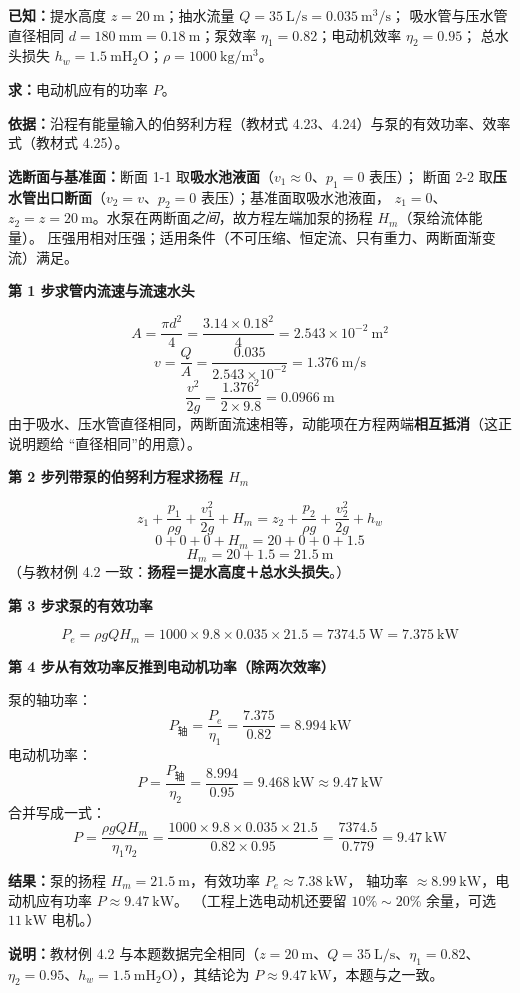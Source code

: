 \begin{jie}
\textbf{已知：}提水高度 $z=20\ \mathrm{m}$；抽水流量 $Q=35\ \mathrm{L/s}=0.035\ \mathrm{m^3/s}$；
吸水管与压水管直径相同 $d=180\ \mathrm{mm}=0.18\ \mathrm{m}$；泵效率 $\eta_1=0.82$；电动机效率 $\eta_2=0.95$；
总水头损失 $h_w=1.5\ \mathrm{mH_2O}$；$\rho=1000\ \mathrm{kg/m^3}$。

\textbf{求：}电动机应有的功率 $P$。

\textbf{依据：}沿程有能量输入的伯努利方程（教材式 4.23、4.24）与泵的有效功率、效率式（教材式 4.25）。

\textbf{选断面与基准面：}断面 1-1 取\textbf{吸水池液面}（$v_1\approx0$、$p_1=0$ 表压）；
断面 2-2 取\textbf{压水管出口断面}（$v_2=v$、$p_2=0$ 表压）；基准面取吸水池液面，
$z_1=0$、$z_2=z=20\ \mathrm{m}$。水泵在两断面\emph{之间}，故方程左端加泵的扬程 $H_m$（泵给流体能量）。
压强用相对压强；适用条件（不可压缩、恒定流、只有重力、两断面渐变流）满足。

\textbf{第 1 步\quad 求管内流速与流速水头}

\[ A=\frac{\pi d^2}{4}=\frac{3.14\times0.18^2}{4}=2.543\times10^{-2}\ \mathrm{m^2} \]
\[ v=\frac{Q}{A}=\frac{0.035}{2.543\times10^{-2}}=1.376\ \mathrm{m/s} \]
\[ \frac{v^2}{2g}=\frac{1.376^2}{2\times9.8}=0.0966\ \mathrm{m} \]
由于吸水、压水管直径相同，两断面流速相等，动能项在方程两端\textbf{相互抵消}（这正说明题给
“直径相同”的用意）。

\textbf{第 2 步\quad 列带泵的伯努利方程求扬程 $H_m$}

\[ z_1+\frac{p_1}{\rho g}+\frac{v_1^2}{2g}+H_m=z_2+\frac{p_2}{\rho g}+\frac{v_2^2}{2g}+h_w \]
\[ 0+0+0+H_m=20+0+0+1.5 \]
\[ H_m=20+1.5=21.5\ \mathrm{m} \]
（与教材例 4.2 一致：\textbf{扬程＝提水高度＋总水头损失}。）

\textbf{第 3 步\quad 求泵的有效功率}

\[ P_e=\rho gQH_m=1000\times9.8\times0.035\times21.5=7374.5\ \mathrm{W}=7.375\ \mathrm{kW} \]

\textbf{第 4 步\quad 从有效功率反推到电动机功率（除两次效率）}

泵的轴功率：
\[ P_{\text{轴}}=\frac{P_e}{\eta_1}=\frac{7.375}{0.82}=8.994\ \mathrm{kW} \]
电动机功率：
\[ P=\frac{P_{\text{轴}}}{\eta_2}=\frac{8.994}{0.95}=9.468\ \mathrm{kW}\approx9.47\ \mathrm{kW} \]
合并写成一式：
\[ P=\frac{\rho gQH_m}{\eta_1\eta_2}=\frac{1000\times9.8\times0.035\times21.5}{0.82\times0.95}
   =\frac{7374.5}{0.779}=9.47\ \mathrm{kW} \]

\textbf{结果：}泵的扬程 $H_m=21.5\ \mathrm{m}$，有效功率 $P_e\approx7.38\ \mathrm{kW}$，
轴功率 $\approx8.99\ \mathrm{kW}$，电动机应有功率 $P\approx9.47\ \mathrm{kW}$。
（工程上选电动机还要留 $10\%\sim20\%$ 余量，可选 $11\ \mathrm{kW}$ 电机。）

\textbf{说明：}教材例 4.2 与本题数据完全相同（$z=20\ \mathrm{m}$、$Q=35\ \mathrm{L/s}$、$\eta_1=0.82$、
$\eta_2=0.95$、$h_w=1.5\ \mathrm{mH_2O}$），其结论为 $P\approx9.47\ \mathrm{kW}$，本题与之一致。
\end{jie}

